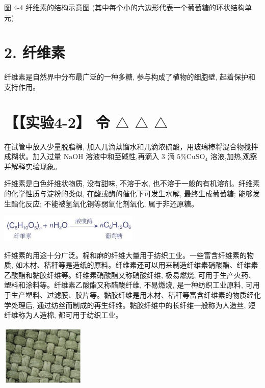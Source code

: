 \documentclass[10pt]{article}
\begin{document}
图 4-4 纤维素的结构示意图 (其中每个小的六边形代表一个葡萄糖的环状结构单元)

\section*{2. 纤维素}

纤维素是自然界中分布最广泛的一种多糖, 参与构成了植物的细胞壁, 起着保护和支持作用。

\section*{【【实验4-2】 令 \(\bigtriangleup\) \(\bigtriangleup\) \(\bigtriangleup\)}

在试管中放入少量脱脂棉, 加入几滴蒸馏水和几滴浓硫酸，用玻璃棒将混合物搅拌成糊状。加入过量 \(\mathrm{{NaOH}}\) 溶液中和至碱性,再滴入 3 滴 \(5\% {\mathrm{{CuSO}}}_{4}\) 溶液,加热,观察并解释实验现象。

纤维素是白色纤维状物质, 没有甜味, 不溶于水, 也不溶于一般的有机溶剂。纤维素的化学性质与淀粉的类似, 在酸或酶的催化下可发生水解, 最终生成葡萄糖; 能够发生酯化反应; 不能被氢氧化铜等弱氧化剂氧化, 属于非还原糖。

\begin{center}
\includegraphics[max width=0.5\textwidth]{images/0190efc5-b58a-7c43-bfb0-e0a030df9cfd_114_866864.jpg}
\end{center}

纤维素的用途十分广泛。棉和麻的纤维大量用于纺织工业。一些富含纤维素的物质, 如木材、秸秆等是造纸的原料。纤维素还可以用来制造纤维素硝酸酯、纤维素乙酸酯和黏胶纤维等。纤维素硝酸酯又称硝酸纤维, 极易燃烧, 可用于生产火药、塑料和涂料等。纤维素乙酸酯又称醋酸纤维, 不易燃烧, 是一种纺织工业原料, 可用于生产塑料、过滤膜、胶片等。黏胶纤维是用木材、秸秆等富含纤维素的物质经化学处理后, 通过纺丝而制成的再生纤维。黏胶纤维中的长纤维一般称为人造丝, 短纤维称为人造棉, 都可用于纺织工业。

\begin{center}
\includegraphics[max width=0.3\textwidth]{images/0190efc5-b58a-7c43-bfb0-e0a030df9cfd_114_119213.jpg}
\end{center}
\end{document}
